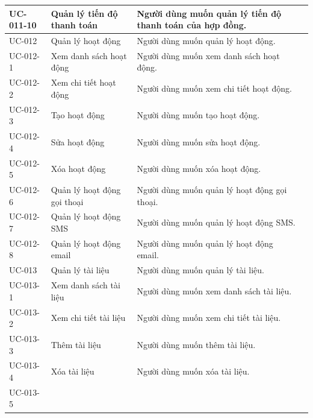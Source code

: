 \documentclass[12pt,a4paper]{article}
\begin{document}
\begin{center}
\begin{longtable}{|p{2.5cm}|p{4.5cm}|p{7.5cm}|c|}
            UC-011-10
            & Quản lý tiến độ thanh toán
            & Người dùng muốn quản lý tiến độ thanh toán của hợp đồng.
            \\ \hline
            UC-012
            & Quản lý hoạt động
            & Người dùng muốn quản lý hoạt động.
            \\ \hline
            UC-012-1
            & Xem danh sách hoạt động
            & Người dùng muốn xem danh sách hoạt động.
            \\ \hline
            UC-012-2
            & Xem chi tiết hoạt động
            & Người dùng muốn xem chi tiết hoạt động.
            \\ \hline
            UC-012-3
            & Tạo hoạt động
            & Người dùng muốn tạo hoạt động.
            \\ \hline
            UC-012-4
            & Sửa hoạt động
            & Người dùng muốn sửa hoạt động.
            \\ \hline
            UC-012-5
            & Xóa hoạt động
            & Người dùng muốn xóa hoạt động.
            \\ \hline
            UC-012-6
            & Quản lý hoạt động gọi thoại
            & Người dùng muốn quản lý hoạt động gọi thoại.
            \\ \hline
            UC-012-7
            & Quản lý hoạt động SMS
            & Người dùng muốn quản lý hoạt động SMS.
            \\ \hline
            UC-012-8
            & Quản lý hoạt động email
            & Người dùng muốn quản lý hoạt động email.
            \\ \hline
            UC-013
            & Quản lý tài liệu
            & Người dùng muốn quản lý tài liệu.
            \\ \hline
            UC-013-1
            & Xem danh sách tài liệu
            & Người dùng muốn xem danh sách tài liệu.
            \\ \hline
            UC-013-2
            & Xem chi tiết tài liệu
            & Người dùng muốn xem chi tiết tài liệu.
            \\ \hline
            UC-013-3
            & Thêm tài liệu
            & Người dùng muốn thêm tài liệu.
            \\ \hline
            UC-013-4
            & Xóa tài liệu
            & Người dùng muốn xóa tài liệu.
            \\ \hline
            UC-013-5

\end{longtable}
\end{center}
\end{document}
